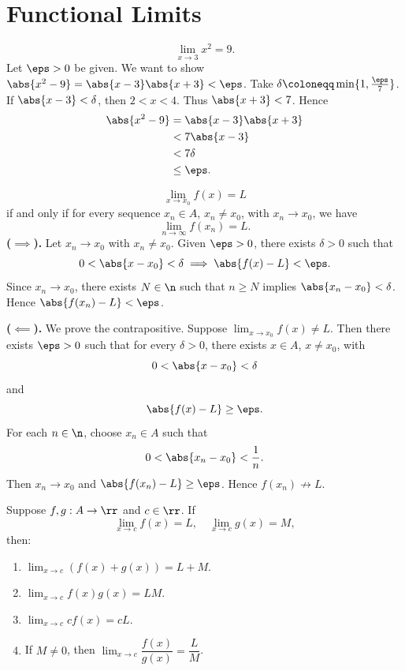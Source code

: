 
\section{Functional Limits}


\begin{problem}{
    \[
        \lim_{x\to 3} x^2 = 9.
    \]
}
    Let $\eps > 0$ be given.
    We want to show $\abs{x^2 - 9} = \abs{x - 3}\abs{x + 3} < \eps$.
    Take $\delta \coloneqq \min\{1, \frac{\eps}{7}\}$.
    If $\abs{x-3}<\delta$, then $2 < x < 4$.
    Thus $\abs{x+3} < 7$.
    Hence
    \begin{align*}
        \abs{x^2 - 9} &= \abs{x-3}\abs{x+3}\\
        &< 7\abs{x-3}\\
        &< 7\delta\\
        &\leq \eps.
    \end{align*}
\end{problem}
\begin{theorem}{
    \[
        \lim_{x\to x_0} f(x) = L
    \]
    if and only if for every sequence $x_n\in A$, $x_n\neq x_0$, with $x_n\to x_0$, we have
    \[
        \lim_{n\to\infty} f(x_n) = L.
    \]
}
    \textbf{($\implies$).}
    Let $x_n\to x_0$ with $x_n\neq x_0$.
    Given $\eps > 0$, there exists $\delta > 0$ such that
    \[
        0 < \abs{x-x_0} < \delta \implies \abs{f(x)-L} < \eps.
    \]
    Since $x_n\to x_0$, there exists $N\in\n$ such that $n\geq N$ implies $\abs{x_n-x_0}<\delta$.
    Hence $\abs{f(x_n)-L}<\eps$.

    \textbf{($\impliedby$).}
    We prove the contrapositive.
    Suppose $\lim_{x\to x_0} f(x) \neq L$.
    Then there exists $\eps > 0$ such that for every $\delta > 0$, there exists $x\in A$, $x\neq x_0$, with
    \[
        0 < \abs{x-x_0} < \delta
    \]
    and
    \[
        \abs{f(x)-L} \geq \eps.
    \]
    For each $n\in\n$, choose $x_n\in A$ such that
    \[
        0 < \abs{x_n-x_0} < \frac{1}{n}.
    \]
    Then $x_n\to x_0$ and $\abs{f(x_n)-L} \geq \eps$.
    Hence $f(x_n)\not\to L$.
\end{theorem}

\begin{theorem*}{
    Suppose $f,g : A\to\rr$ and $c\in\rr$.
    If
    \[
        \lim_{x\to c} f(x) = L,\quad \lim_{x\to c} g(x) = M,
    \]
    then:
    \begin{enumerate}
        \item $\lim_{x\to c} (f(x) + g(x)) = L + M$.
        \item $\lim_{x\to c} f(x)g(x) = LM$.
        \item $\lim_{x\to c} cf(x) = cL$.
        \item If $M\neq 0$, then $\lim_{x\to c} \dfrac{f(x)}{g(x)} = \dfrac{L}{M}$.
    \end{enumerate}
}
\end{theorem*}

